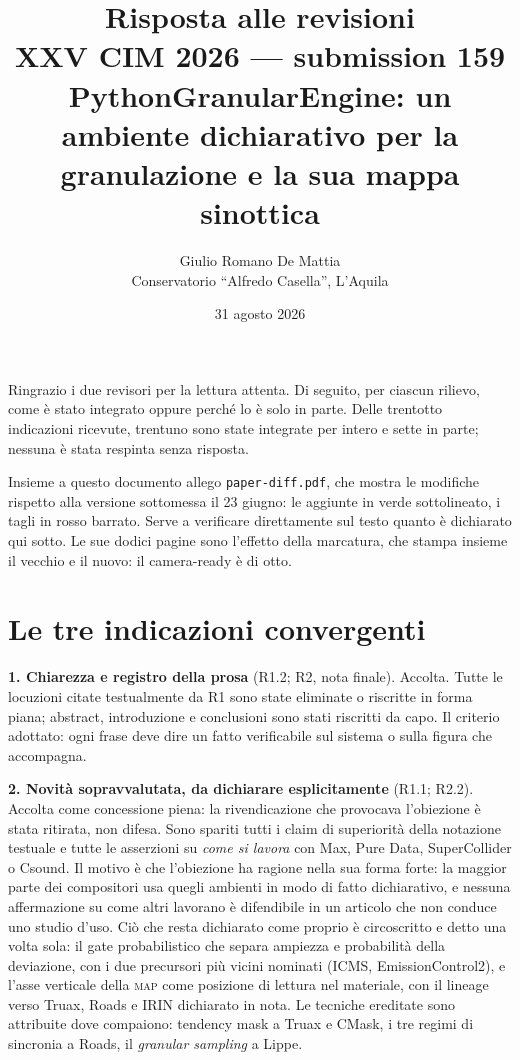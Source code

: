 \documentclass[11pt,a4paper]{article}
\title{\textbf{Risposta alle revisioni}\\[4pt]
\large XXV CIM 2026 --- submission 159\\
\normalsize PythonGranularEngine: un ambiente dichiarativo per la granulazione
e la sua mappa sinottica}
\author{Giulio Romano De Mattia\\ Conservatorio ``Alfredo Casella'', L'Aquila}
\date{31 agosto 2026}
\begin{document}
\maketitle

Ringrazio i due revisori per la lettura attenta. Di seguito, per ciascun
rilievo, come è stato integrato oppure perché lo è solo in parte. Delle
trentotto indicazioni ricevute, trentuno sono state integrate per intero e
sette in parte; nessuna è stata respinta senza risposta.

Insieme a questo documento allego \texttt{paper-diff.pdf}, che mostra le
modifiche rispetto alla versione sottomessa il 23 giugno: le aggiunte in
verde sottolineato, i tagli in rosso barrato. Serve a verificare
direttamente sul testo quanto è dichiarato qui sotto. Le sue dodici pagine
sono l'effetto della marcatura, che stampa insieme il vecchio e il nuovo: il
camera-ready è di otto.

\section*{Le tre indicazioni convergenti}

\textbf{1. Chiarezza e registro della prosa} (R1.2; R2, nota finale).
Accolta. Tutte le locuzioni citate testualmente da R1 sono state eliminate o
riscritte in forma piana; abstract, introduzione e conclusioni sono stati
riscritti da capo. Il criterio adottato: ogni frase deve dire un fatto
verificabile sul sistema o sulla figura che accompagna.

\textbf{2. Novità sopravvalutata, da dichiarare esplicitamente} (R1.1;
R2.2). Accolta come concessione piena: la rivendicazione che provocava
l'obiezione è stata ritirata, non difesa. Sono spariti tutti i claim di
superiorità della notazione testuale e tutte le asserzioni su \emph{come si
lavora} con Max, Pure Data, SuperCollider o Csound. Il motivo è che
l'obiezione ha ragione nella sua forma forte: la maggior parte dei
compositori usa quegli ambienti in modo di fatto dichiarativo, e nessuna
affermazione su come altri lavorano è difendibile in un articolo che non
conduce uno studio d'uso. Ciò che resta dichiarato come proprio è
circoscritto e detto una volta sola: il gate probabilistico che separa
ampiezza e probabilità della deviazione, con i due precursori più vicini
nominati (ICMS, EmissionControl2), e l'asse verticale della \textsc{map}
come posizione di lettura nel materiale, con il lineage verso Truax,
Roads e IRIN dichiarato in nota. Le tecniche ereditate sono attribuite dove
compaiono: tendency mask a Truax e CMask, i tre regimi di sincronia a Roads,
il \emph{granular sampling} a Lippe.
\end{document}
